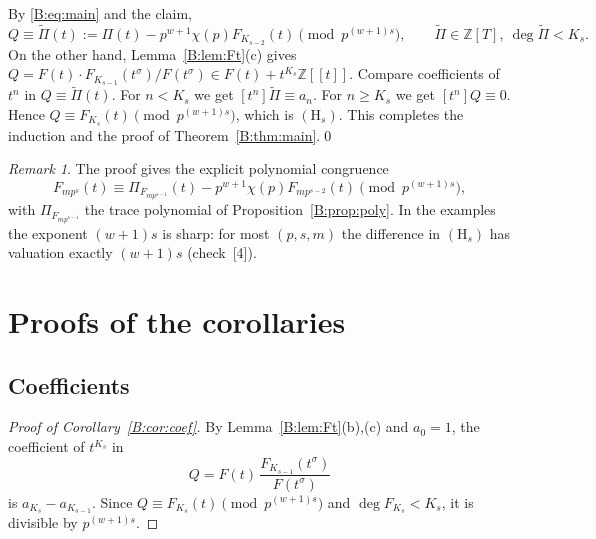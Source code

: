 \documentclass[11pt,a4paper]{article}
\theoremstyle{definition}\newtheorem{definition}[theorem]{Definition}
\theoremstyle{remark}\newtheorem{remark}[theorem]{Remark}
\newcommand{\Z}{\mathbb Z}
\numberwithin{equation}{section}
\begin{document}
By \eqref{B:eq:main} and the claim,
\[
Q\equiv\widetilde\Pi(t):=\Pi(t)-p^{w+1}\chi(p)F_{K_{s-2}}(t)\pmod{p^{(w+1)s}},\qquad
\widetilde\Pi\in\Z[T],\ \deg\widetilde\Pi<K_s .
\]
On the other hand, Lemma~\ref{B:lem:Ft}(c) gives
$Q=F(t)\cdot F_{K_{s-1}}(t^\sigma)/F(t^\sigma)\in F(t)+t^{K_s}\Z[[t]]$. Compare coefficients of
$t^n$ in $Q\equiv\widetilde\Pi(t)$. For $n<K_s$ we get $[t^n]\widetilde\Pi\equiv a_n$. For
$n\ge K_s$ we get $[t^n]Q\equiv0$. Hence $Q\equiv F_{K_s}(t)\pmod{p^{(w+1)s}}$, which is
$(\mathrm H_s)$. This completes the induction and the proof of Theorem~\ref{B:thm:main}.\qed

\begin{remark}
The proof gives the explicit polynomial congruence
\[
F_{mp^s}(t)\equiv\Pi_{F_{mp^{s-1}}}(t)-p^{w+1}\chi(p)F_{mp^{s-2}}(t)\pmod{p^{(w+1)s}},
\]
with $\Pi_{F_{mp^{s-1}}}$ the trace polynomial of Proposition~\ref{B:prop:poly}. In the examples the
exponent $(w+1)s$ is sharp: for most $(p,s,m)$ the difference in $(\mathrm H_s)$ has valuation exactly
$(w+1)s$ (check~[4]).
\end{remark}

\section{Proofs of the corollaries}\label{B:source-main-5}\label{B:sec:cor}

\subsection{Coefficients}
\begin{proof}[Proof of Corollary~\ref{B:cor:coef}]
By Lemma~\ref{B:lem:Ft}(b),(c) and $a_0=1$, the coefficient of $t^{K_s}$ in
\[
Q=F(t)\,\frac{F_{K_{s-1}}(t^\sigma)}{F(t^\sigma)}
\]
is $a_{K_s}-a_{K_{s-1}}$. Since
$Q\equiv F_{K_s}(t)\pmod{p^{(w+1)s}}$ and $\deg F_{K_s}<K_s$, it is divisible by $p^{(w+1)s}$.
\end{proof}
\end{document}
